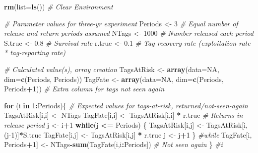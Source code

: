\documentclass[
]{krantz}
\makeatletter
\newenvironment{Shaded}{\begin{snugshade}}{\end{snugshade}}
\newcommand{\AttributeTok}[1]{\textcolor[rgb]{0.27,0.27,0.27}{#1}}
\newcommand{\CommentTok}[1]{\textcolor[rgb]{0.37,0.37,0.37}{\textit{#1}}}
\newcommand{\ConstantTok}[1]{\textcolor[rgb]{0.37,0.37,0.37}{#1}}
\newcommand{\ControlFlowTok}[1]{\textcolor[rgb]{0.27,0.27,0.27}{\textbf{#1}}}
\newcommand{\DecValTok}[1]{\textcolor[rgb]{0.06,0.06,0.06}{#1}}
\newcommand{\FloatTok}[1]{\textcolor[rgb]{0.06,0.06,0.06}{#1}}
\newcommand{\FunctionTok}[1]{\textcolor[rgb]{0.27,0.27,0.27}{\textbf{#1}}}
\newcommand{\NormalTok}[1]{#1}
\newcommand{\OtherTok}[1]{\textcolor[rgb]{0.37,0.37,0.37}{#1}}
\newcommand{\SpecialCharTok}[1]{\textcolor[rgb]{0.43,0.43,0.43}{\textbf{#1}}}
\newenvironment{kframe}{%
\medskip{}
\setlength{\fboxsep}{.8em}
 \def\at@end@of@kframe{}%
 \ifinner\ifhmode%
  \def\at@end@of@kframe{\end{minipage}}%
  \begin{minipage}{\columnwidth}%
 \fi\fi%
 \def\FrameCommand##1{\hskip\@totalleftmargin \hskip-\fboxsep
 \colorbox{shadecolor}{##1}\hskip-\fboxsep
     \hskip-\linewidth \hskip-\@totalleftmargin \hskip\columnwidth}%
 \MakeFramed {\advance\hsize-\width
   \@totalleftmargin\z@ \linewidth\hsize
   \@setminipage}}%
 {\par\unskip\endMakeFramed%
 \at@end@of@kframe}
\renewenvironment{Shaded}{\begin{kframe}}{\end{kframe}}
\makeatother
\begin{document}
\begin{Shaded}
\begin{Highlighting}[]
\FunctionTok{rm}\NormalTok{(}\AttributeTok{list=}\FunctionTok{ls}\NormalTok{()) }\CommentTok{\# Clear Environment}

\CommentTok{\# Parameter values for three{-}yr experiment}
\NormalTok{Periods }\OtherTok{\textless{}{-}} \DecValTok{3}  \CommentTok{\# Equal number of release and return periods assumed}
\NormalTok{NTags }\OtherTok{\textless{}{-}} \DecValTok{1000} \CommentTok{\# Number released each period}
\NormalTok{S.true }\OtherTok{\textless{}{-}} \FloatTok{0.8} \CommentTok{\# Survival rate}
\NormalTok{r.true }\OtherTok{\textless{}{-}} \FloatTok{0.1} \CommentTok{\# Tag recovery rate (exploitation rate * tag{-}reporting rate)}

\CommentTok{\# Calculated value(s), array creation}
\NormalTok{TagsAtRisk }\OtherTok{\textless{}{-}} \FunctionTok{array}\NormalTok{(}\AttributeTok{data=}\ConstantTok{NA}\NormalTok{, }\AttributeTok{dim=}\FunctionTok{c}\NormalTok{(Periods, Periods))}
\NormalTok{TagFate }\OtherTok{\textless{}{-}} \FunctionTok{array}\NormalTok{(}\AttributeTok{data=}\ConstantTok{NA}\NormalTok{, }\AttributeTok{dim=}\FunctionTok{c}\NormalTok{(Periods, Periods}\SpecialCharTok{+}\DecValTok{1}\NormalTok{))   }
\CommentTok{\# Extra column for tags not seen again}

\ControlFlowTok{for}\NormalTok{ (i }\ControlFlowTok{in} \DecValTok{1}\SpecialCharTok{:}\NormalTok{Periods)\{ }
\CommentTok{\# Expected values for tags{-}at{-}risk, returned/not{-}seen{-}again}
\NormalTok{    TagsAtRisk[i,i] }\OtherTok{\textless{}{-}}\NormalTok{ NTags}
\NormalTok{    TagFate[i,i] }\OtherTok{\textless{}{-}}\NormalTok{  TagsAtRisk[i,i] }\SpecialCharTok{*}\NormalTok{ r.true }\CommentTok{\# Returns in release period}
\NormalTok{  j }\OtherTok{\textless{}{-}}\NormalTok{ i}\SpecialCharTok{+}\DecValTok{1}
  \ControlFlowTok{while}\NormalTok{(j }\SpecialCharTok{\textless{}=}\NormalTok{ Periods) \{}
\NormalTok{      TagsAtRisk[i,j] }\OtherTok{\textless{}{-}}\NormalTok{ TagsAtRisk[i,(j}\DecValTok{{-}1}\NormalTok{)]}\SpecialCharTok{*}\NormalTok{S.true}
\NormalTok{      TagFate[i,j] }\OtherTok{\textless{}{-}}\NormalTok{ TagsAtRisk[i,j] }\SpecialCharTok{*}\NormalTok{ r.true}
\NormalTok{      j }\OtherTok{\textless{}{-}}\NormalTok{ j}\SpecialCharTok{+}\DecValTok{1}
\NormalTok{     \} }\CommentTok{\#while}
\NormalTok{   TagFate[i, Periods}\SpecialCharTok{+}\DecValTok{1}\NormalTok{] }\OtherTok{\textless{}{-}}\NormalTok{ NTags}\SpecialCharTok{{-}}\FunctionTok{sum}\NormalTok{(TagFate[i,i}\SpecialCharTok{:}\NormalTok{Periods]) }\CommentTok{\# Not seen again}
\NormalTok{  \} }\CommentTok{\#i}


\end{Highlighting}
\end{Shaded}
\end{document}

